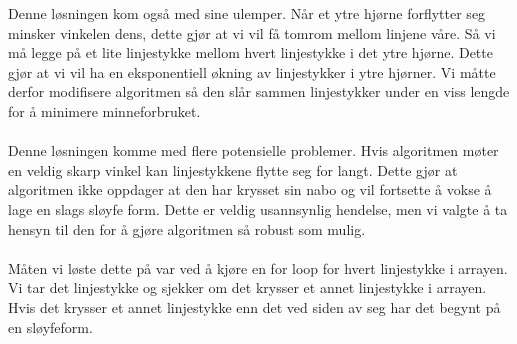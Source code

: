 \noindent
Denne løsningen kom også med sine ulemper. Når et ytre hjørne forflytter seg minsker vinkelen dens, dette gjør at vi vil få tomrom mellom linjene våre. Så vi må legge på et lite linjestykke mellom hvert linjestykke i det ytre hjørne. Dette gjør at vi vil ha en eksponentiell økning av linjestykker i ytre hjørner. Vi måtte derfor modifisere algoritmen så den slår sammen linjestykker under en viss lengde for å minimere minneforbruket.\\ \\
Denne løsningen komme med flere potensielle problemer. Hvis algoritmen møter en veldig skarp vinkel kan linjestykkene flytte seg for langt. Dette gjør at algoritmen ikke oppdager at den har krysset sin nabo og vil fortsette å vokse å lage en slags sløyfe form. Dette er veldig usannsynlig hendelse, men vi valgte å ta hensyn til den for å gjøre algoritmen så robust som mulig.\\ \\
Måten vi løste dette på var ved å kjøre en for loop for hvert linjestykke i arrayen. Vi tar det linjestykke og sjekker om det krysser et annet linjestykke i arrayen. Hvis det krysser et annet linjestykke enn det ved siden av seg har det begynt på en sløyfeform.  

 





